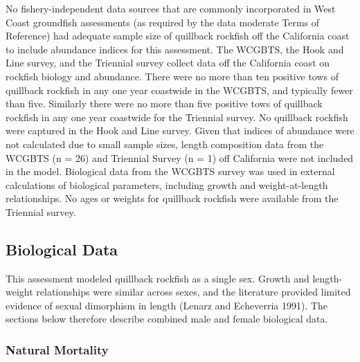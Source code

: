 \documentclass[11pt,
  english,
  a4paper,
]{article}
\begin{document}
No fishery-independent data sources that are commonly incorporated in West Coast groundfish assessments (as required by the data moderate Terms of Reference) had adequate sample size of quillback rockfish off the California coast to include abundance indices for this assessment. The WCGBTS, the Hook and Line survey, and the Triennial survey collect data off the California coast on rockfish biology and abundance. There were no more than ten positive tows of quillback rockfish in any one year coastwide in the WCGBTS, and typically fewer than five. Similarly there were no more than five positive tows of quillback rockfish in any one year coastwide for the Triennial survey. No quillback rockfish were captured in the Hook and Line survey. Given that indices of abundance were not calculated due to small sample sizes, length composition data from the WCGBTS (n = 26) and Triennial Survey (n = 1) off California were not included in the model. Biological data from the WCGBTS survey was used in external calculations of biological parameters, including growth and weight-at-length relationships. No ages or weights for quillback rockfish were available from the Triennial survey.

\leavevmode\tagmcend\tagstructend\par


\hypertarget{biological-data}{%
\subsection{Biological Data}\label{biological-data}}

\leavevmode\tagmcend\tagstructend


This assessment modeled quillback rockfish as a single sex. Growth and length-weight relationships were similar across sexes, and the literature provided limited evidence of sexual dimorphism in length {(Lenarz and Echeverria 1991)\leavevmode\tagmcend\tagstructend}. The sections below therefore describe combined male and female biological data.

\leavevmode\tagmcend\tagstructend\par


\hypertarget{natural-mortality}{%
\subsubsection{Natural Mortality}\label{natural-mortality}}
\end{document}
